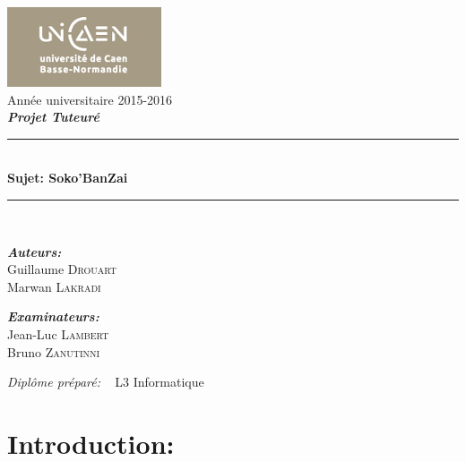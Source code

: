 \documentclass[a4paper,12pt]{article} %
\newcommand{\HRule}{\rule{\linewidth}{1mm}} %
\begin{document}



\begin{titlepage}
\begin{center}
\includegraphics[scale=0.5]{logo-ucbn.png}
\\[3cm]
\Large{Année universitaire 2015-2016}\\[0.5cm]
{\Large \textit{\bfseries {Projet Tuteuré}}}
\\[1cm]
\HRule 
\\[0.4cm]

{\huge {\bfseries {Sujet: Soko'BanZai}}}
\\[0.4cm] 
\HRule\\[1.5cm]

\begin{minipage}{0.4\textwidth}
\begin{flushleft} \large
\emph{\bfseries {Auteurs:}}\\
Guillaume \textsc{Drouart}\\
Marwan \textsc{Lakradi}
\end{flushleft}
\end{minipage}
\begin{minipage}{0.4\textwidth}
\begin{flushright} \large
\emph{\bfseries{Examinateurs:}} \\
Jean-Luc \textsc{Lambert}\\
Bruno \textsc{Zanutinni}
\end{flushright}
\end{minipage}
\vfill
{\large \emph{Diplôme préparé:} ~ L3 Informatique}\\
\end{center}
\end{titlepage}



\renewcommand{\contentsname}{Sommaire}
\tableofcontents
\newpage

\section{Introduction:}
\end{document}
